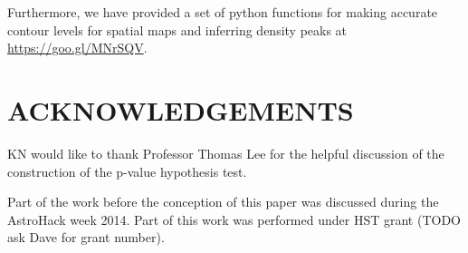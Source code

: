 Furthermore, we have provided a set of python functions for making accurate 
contour levels for spatial maps and inferring density peaks at 
\href{https://goo.gl/MNrSQV}{https://goo.gl/MNrSQV}.
% 
% 
% 
% 
% 
% 
% 


\section{ACKNOWLEDGEMENTS}
KN would like to thank Professor Thomas Lee for the helpful discussion of 
the construction of the p-value hypothesis test. 

Part of the work before the conception of this paper was discussed during 
the AstroHack week 2014. 
Part of this work was performed under HST grant (TODO ask Dave for grant
number). 
% 
% 
% 
% 
% 
% 
% 

